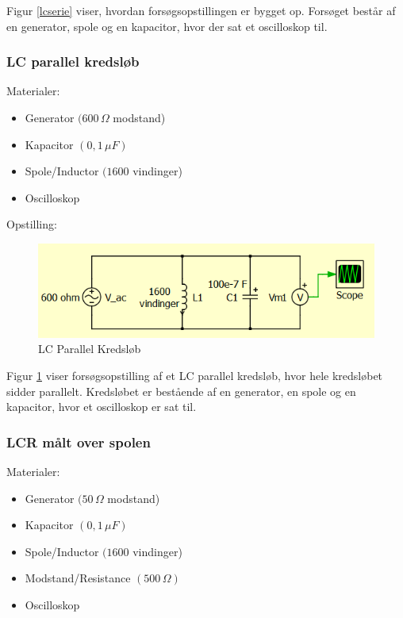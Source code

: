 Figur \ref{lcserie} viser, hvordan forsøgsopstillingen er bygget op. Forsøget består af en generator, spole og en kapacitor, hvor der sat et oscilloskop til.

\subsubsection{LC parallel kredsløb}

Materialer:

\begin{itemize}
\item Generator $(600\, \Omega$ modstand)
\item Kapacitor $( 0,1\, \mu F)$
\item Spole/Inductor $(1600$ vindinger)
\item Oscilloskop
\end{itemize}

Opstilling:

\begin{figure}[H]
\centering
\includegraphics[scale=1]{Vildledning/Schematics/Kredslb/LC_Parallel}
\caption{LC Parallel Kredsløb}
\label{lcparallel}
\end{figure}

Figur \ref{lcparallel} viser forsøgsopstilling af et LC parallel kredsløb, hvor hele kredsløbet sidder parallelt. Kredsløbet er bestående af en generator, en spole og en kapacitor, hvor et oscilloskop er sat til.

\subsubsection{LCR målt over spolen}

Materialer:

\begin{itemize}
\item Generator $(50\, \Omega$ modstand)
\item Kapacitor $( 0,1\, \mu F)$
\item Spole/Inductor $(1600$ vindinger)
\item Modstand/Resistance $(500\, \Omega)$
\item Oscilloskop
\end{itemize}

